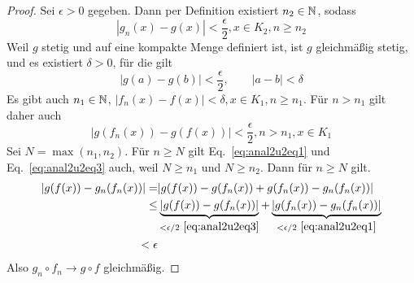 \begin{proof}
	Sei $\epsilon>0$ gegeben. Dann per Definition existiert $n_2\in\mathbb{N}$, sodass 
	\begin{equation}\label{eq:anal2u2eq1}
		|g_n(x)-g(x)|<\frac{\epsilon}{2}, x\in K_2, n\ge n_2 
	\end{equation}
	Weil $g$ stetig und auf eine kompakte Menge definiert ist, ist $g$ gleichmäßig stetig, und es existiert $\delta>0$, f\"{u}r die gilt
	\begin{equation}\label{eq:anal2u2eq2}
		|g(a)-g(b)|<\frac{\epsilon}{2}, \qquad |a-b|<\delta
	\end{equation}
	Es gibt auch $n_1\in\mathbb{N}$, $|f_n(x)-f(x)|<\delta, x\in K_1, n\ge n_1$. F\"{u}r $n>n_1$ gilt daher auch
	\begin{equation}\label{eq:anal2u2eq3}
		|g(f_n(x))-g(f(x))|<\frac{\epsilon}{2}, n>n_1, x\in K_1
	\end{equation}
	Sei $N=\max(n_1,n_2)$. F\"{u}r $n\ge N$ gilt Eq.~\eqref{eq:anal2u2eq1} und Eq.~\eqref{eq:anal2u2eq3} auch, weil $N\ge n_1$ und $N\ge n_2$. Dann f\"{u}r $n\ge N$ gilt.
	\begin{align*}
		|g(f(x))-g_n(f_n(x))|		=&|g(f(x))-g(f_n(x))+g(f_n(x))-g_n(f_n(x))|\\
		\le&\underbrace{|g(f(x))-g(f_n(x))|}_{< \epsilon / 2~\eqref{eq:anal2u2eq3}}+\underbrace{|g(f_n(x))-g_n(f_n(x))|}_{< \epsilon / 2~\eqref{eq:anal2u2eq1}}\\
		<\epsilon
	\end{align*}
	Also $g_n\circ f_n\to g\circ f$ gleichmäßig.
\end{proof}
